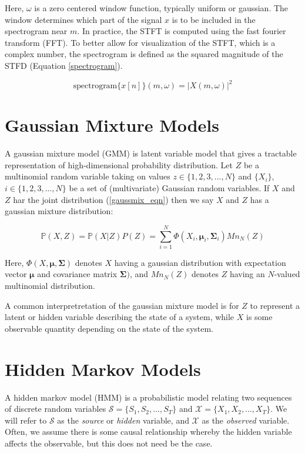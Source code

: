 \documentclass[11pt, oneside, a4paper]{report}
\begin{document}
Here, $\omega$ is a zero centered window function, typically uniform
or gaussian. The window determines which part of the signal $x$ is to
be included in the spectrogram near $m$. In practice, the STFT is
computed using the fast fourier transform (FFT). To better allow for
visualization of the STFT, which is a complex number, the spectrogram
is defined as the squared magnitude of the STFD (Equation \ref{spectrogram}).

\begin{equation}\label{spectrogram}
  \text{spectrogram}\{x[n]\}(m,\omega) = |X(m,\omega)|^2 
\end{equation}


\section{Gaussian Mixture Models}\label{gmm_appendix}
A gaussian mixture model (GMM) is latent variable model that gives a
tractable representation of high-dimensional probability
distribution. Let $Z$ be a multinomial random variable taking on
values $z \in \{1,2,3,...,N\}$ and $\{X_i\}$, $i \in \{1,2,3,...,N\}$
be a set of (multivariate) Gaussian random variables. If $X$ and $Z$
har the joint distribution (\ref{gaussmix_eqn}) then we say $X$ and $Z$
has a gaussian mixture distribution:

\begin{equation}\label{gaussmix_eqn}
  \mathbb{P}(X,Z) = \mathbb{P}(X|Z)P(Z) = \sum_{i = 1}^N
  \Phi(X_i,\mathbf{\mu}_i, \mathbf{\Sigma}_i)Mn_N(Z)
\end{equation}

Here, $\Phi(X,\mathbf{\mu}, \mathbf{\Sigma})$ denotes $X$ having a
gaussian distribution with expectation vector $\mathbf{\mu}$ and
covariance matrix $\mathbf{\Sigma})$, and $Mn_N(Z)$ denotes $Z$ having
an $N$-valued multinomial distribution.

A common interpretretation of the gaussian mixture model is for $Z$ to
represent a latent or hidden variable describing the state of a
system, while $X$ is some observable quantity depending on the state
of the system. 


\section{Hidden Markov Models}\label{hmm_appendix}
A hidden markov model (HMM) is a probabilistic model relating two sequences of
discrete random variables $\mathcal{S} = \{S_1, S_2, ..., S_T\}$ and
$\mathcal{X} = \{X_1, X_2, ..., X_T\}$. We will refer to
$\mathcal{S}$ as the \emph{source} or \emph{hidden} variable, and
$\mathcal{X}$ as the \emph{observed} variable. Often, we assume there
is some causal relationship whereby the hidden variable affects the
observable, but this does not need be the case. 
\end{document}
